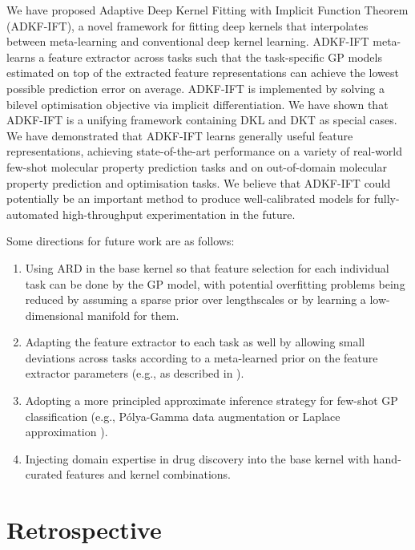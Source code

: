 We have proposed Adaptive Deep Kernel Fitting with Implicit Function Theorem (ADKF-IFT),
a novel framework for fitting deep kernels that interpolates between meta-learning and conventional deep kernel learning.
ADKF-IFT meta-learns a feature extractor across tasks such that the task-specific GP models estimated on top of the
extracted feature representations can achieve the lowest possible prediction error on average.
ADKF-IFT is implemented by solving a bilevel optimisation objective via implicit differentiation.
We have shown that ADKF-IFT is a unifying framework containing DKL and DKT as special cases.
We have demonstrated that ADKF-IFT learns generally useful feature representations, achieving state-of-the-art performance
on a variety of real-world few-shot molecular property prediction tasks and on out-of-domain molecular property prediction
and optimisation tasks. We believe that ADKF-IFT could potentially be an important method to produce well-calibrated models
for fully-automated high-throughput experimentation in the future. 

Some directions for future work are as follows: 
\begin{enumerate}
    \item Using ARD in the base kernel so that feature selection for each individual task can be done by the GP model, with potential overfitting problems being reduced by assuming a sparse prior over lengthscales or by learning a low-dimensional manifold for them.
    \item Adapting the feature extractor to each task as well by allowing small deviations across tasks according to a meta-learned prior on the feature extractor parameters (e.g., as described in \citet{chen2020modular}).
    \item Adopting a more principled approximate inference strategy for few-shot GP classification (e.g., Pólya-Gamma data augmentation \citep{snell2020bayesian} or Laplace approximation \citep{kim2021gaussian}).
    \item Injecting domain expertise in drug discovery into the base kernel with hand-curated features and kernel combinations.
\end{enumerate}

\section{Retrospective}

